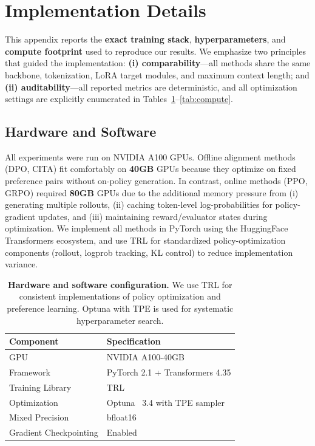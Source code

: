 \section{Implementation Details}
\label{sec:appendix_implementation}

\vspace{-0.25em}
\noindent
This appendix reports the \textbf{exact training stack}, \textbf{hyperparameters}, and \textbf{compute footprint} used to reproduce our results.
We emphasize two principles that guided the implementation:
\textbf{(i) comparability}---all methods share the same backbone, tokenization, LoRA target modules, and maximum context length; and
\textbf{(ii) auditability}---all reported metrics are deterministic, and all optimization settings are explicitly enumerated in Tables~\ref{tab:hardware}--\ref{tab:compute}.

\subsection{Hardware and Software}

\vspace{-0.25em}
\noindent
All experiments were run on NVIDIA A100 GPUs. Offline alignment methods (\textsc{DPO}, \textsc{CITA}) fit comfortably on \textbf{40GB} GPUs because they optimize on fixed preference pairs without on-policy generation.
In contrast, online methods (\textsc{PPO}, \textsc{GRPO}) required \textbf{80GB} GPUs due to the additional memory pressure from (i) generating multiple rollouts, (ii) caching token-level log-probabilities for policy-gradient updates, and (iii) maintaining reward/evaluator states during optimization.
We implement all methods in PyTorch using the HuggingFace Transformers ecosystem, and use TRL for standardized policy-optimization components (rollout, logprob tracking, KL control) to reduce implementation variance.

\begin{table}[ht!]
\centering
\small
\renewcommand{\arraystretch}{1.2}
\begin{tabular}{@{}ll@{}}
\toprule
\textbf{Component} & \textbf{Specification} \\
\midrule
GPU & NVIDIA A100-40GB \\ \hline
Framework & PyTorch 2.1 + Transformers 4.35 \\ \hline
Training Library & TRL~\cite{tunstall2023zephyr} \\ \hline
Optimization & Optuna~\cite{akiba2019optuna} 3.4 with TPE sampler \\ \hline
Mixed Precision & bfloat16 \\ \hline
Gradient Checkpointing & Enabled \\
\bottomrule
\end{tabular}
\caption{\textbf{Hardware and software configuration.} We use TRL for consistent implementations of policy optimization and preference learning. Optuna with TPE is used for systematic hyperparameter search.}
\label{tab:hardware}
\end{table}

